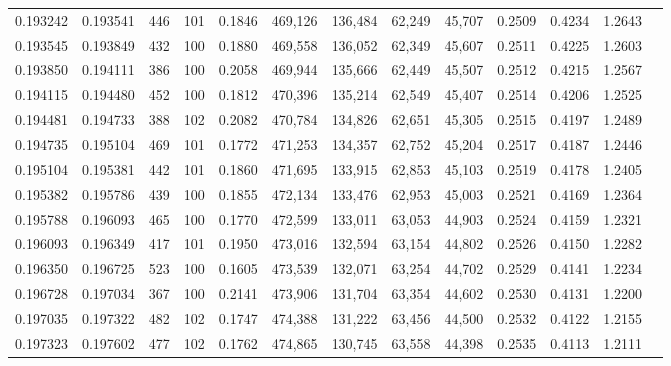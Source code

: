 \begin{tabular}{rrrrrrrrrrrrr}
0.193242 & 0.193541 &   446 & 101 &                                     0.1846 & 469,126 & 136,484 &  62,249 &  45,707 & 0.2509 & 0.4234 & 1.2643 \\
0.193545 & 0.193849 &   432 & 100 &                                     0.1880 & 469,558 & 136,052 &  62,349 &  45,607 & 0.2511 & 0.4225 & 1.2603 \\
0.193850 & 0.194111 &   386 & 100 &                                     0.2058 & 469,944 & 135,666 &  62,449 &  45,507 & 0.2512 & 0.4215 & 1.2567 \\
0.194115 & 0.194480 &   452 & 100 &                                     0.1812 & 470,396 & 135,214 &  62,549 &  45,407 & 0.2514 & 0.4206 & 1.2525 \\
0.194481 & 0.194733 &   388 & 102 &                                     0.2082 & 470,784 & 134,826 &  62,651 &  45,305 & 0.2515 & 0.4197 & 1.2489 \\
0.194735 & 0.195104 &   469 & 101 &                                     0.1772 & 471,253 & 134,357 &  62,752 &  45,204 & 0.2517 & 0.4187 & 1.2446 \\
0.195104 & 0.195381 &   442 & 101 &                                     0.1860 & 471,695 & 133,915 &  62,853 &  45,103 & 0.2519 & 0.4178 & 1.2405 \\
0.195382 & 0.195786 &   439 & 100 &                                     0.1855 & 472,134 & 133,476 &  62,953 &  45,003 & 0.2521 & 0.4169 & 1.2364 \\
0.195788 & 0.196093 &   465 & 100 &                                     0.1770 & 472,599 & 133,011 &  63,053 &  44,903 & 0.2524 & 0.4159 & 1.2321 \\
0.196093 & 0.196349 &   417 & 101 &                                     0.1950 & 473,016 & 132,594 &  63,154 &  44,802 & 0.2526 & 0.4150 & 1.2282 \\
0.196350 & 0.196725 &   523 & 100 &                                     0.1605 & 473,539 & 132,071 &  63,254 &  44,702 & 0.2529 & 0.4141 & 1.2234 \\
0.196728 & 0.197034 &   367 & 100 &                                     0.2141 & 473,906 & 131,704 &  63,354 &  44,602 & 0.2530 & 0.4131 & 1.2200 \\
0.197035 & 0.197322 &   482 & 102 &                                     0.1747 & 474,388 & 131,222 &  63,456 &  44,500 & 0.2532 & 0.4122 & 1.2155 \\
0.197323 & 0.197602 &   477 & 102 &                                     0.1762 & 474,865 & 130,745 &  63,558 &  44,398 & 0.2535 & 0.4113 & 1.2111 \\

\end{tabular}

